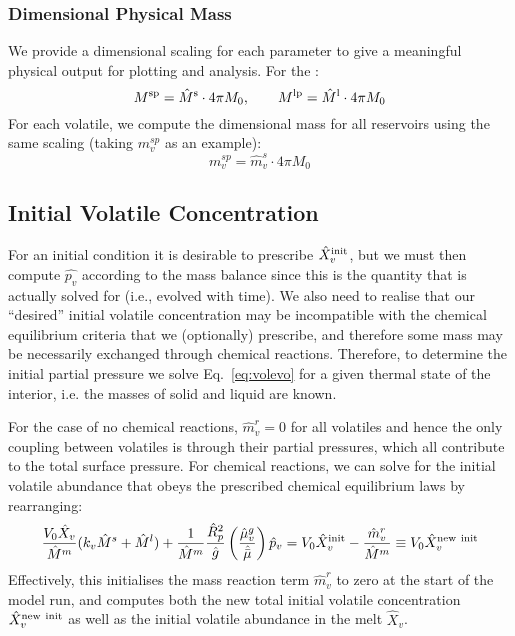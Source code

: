 \subsubsection{Dimensional Physical Mass}
We provide a dimensional scaling for each parameter to give a meaningful physical output for plotting and analysis.  For the :
\begin{equation}
M^{\rm sp} = \hat{M}^{\rm s} \cdot 4 \pi M_0, \qquad M^{\rm lp} = \hat{M}^{\rm l} \cdot 4 \pi M_0
\end{equation}
For each volatile, we compute the dimensional mass for all reservoirs using the same scaling (taking $m_v^{sp}$ as an example):
\begin{equation}
m_v^{sp} = \hat{m}_v^s \cdot 4 \pi M_0
\end{equation}
\subsection{Initial Volatile Concentration}
For an initial condition it is desirable to prescribe $\hat{X}_v^{\rm init}$, but we must then compute $\hat{p_v}$ according to the mass balance since this is the quantity that is actually solved for (i.e., evolved with time).  We also need to realise that our ``desired'' initial volatile concentration may be incompatible with the chemical equilibrium criteria that we (optionally) prescribe, and therefore some mass may be necessarily exchanged through chemical reactions.  Therefore, to determine the initial partial pressure we solve Eq.~\ref{eq:volevo} for a given thermal state of the interior, i.e. the masses of solid and liquid are known.

For the case of no chemical reactions, $\hat{m}_v^r=0$ for all volatiles and hence the only coupling between volatiles is through their partial pressures, which all contribute to the total surface pressure.  For chemical reactions, we can solve for the initial volatile abundance that obeys the prescribed chemical equilibrium laws by rearranging:
\begin{equation}
\frac{V_0 \hat{X}_v}{\hat{M}^m} (k_v \hat{M}^s + \hat{M}^l) + \frac{1}{\hat{M}^m} \frac{\hat{R}_p^2}{\hat{g}} \left( \frac{\hat{\mu}_v^g}{\hat{\bar{\mu}}} \right)\hat{p}_v = V_0 \hat{X}_v^{\rm init} - \frac{\hat{m}_v^r}{\hat{M}^m} \equiv V_0 \hat{X}_v^{\rm new\ init} 
\label{eq:volinit3}
\end{equation}
Effectively, this initialises the mass reaction term $\hat{m}^r_v$ to zero at the start of the model run, and computes both the new total initial volatile concentration $\hat{X}_v^{\rm new\ init}$ as well as the initial volatile abundance in the melt $\hat{X}_v$.  
